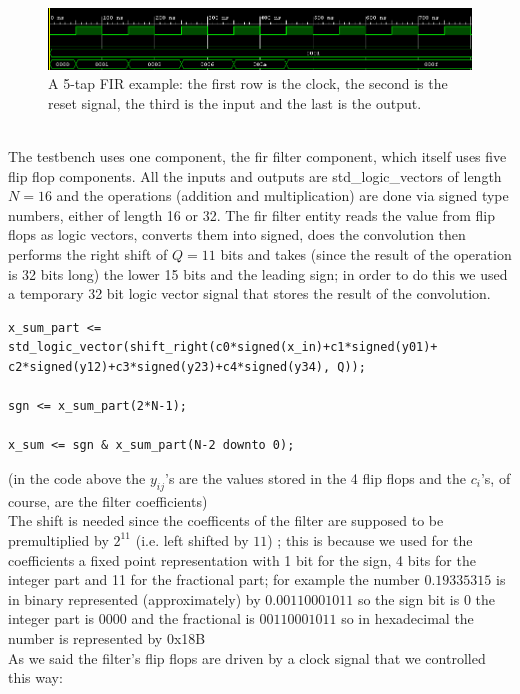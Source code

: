 \documentclass[a4paper,12pt]{article}
\begin{document}
\begin{figure}[h!]
	\begin{flushleft}
		\includegraphics[width=1.2\linewidth,keepaspectratio]{fir5ex.png}
	\end{flushleft}	
	\caption{A 5-tap FIR example: the first row is the clock, the second is the reset signal, the third is the input and the last is the output.}
	\label{fig:fir5ex}
\end{figure}\\
The testbench uses one component, the fir filter component,
which itself uses five flip flop components. All the inputs and outputs are std\_logic\_vectors of length $N=16$ and the operations (addition and multiplication) are done via signed type numbers, either of length 16 or 32. The fir filter entity reads the value from flip flops as logic vectors, converts them into signed, does the convolution then performs the right shift of $Q=11$ bits and takes (since the result of the operation is 32 bits long) the lower 15 bits and the leading sign; in order to do this we used a temporary 32 bit logic vector signal that stores the result of the convolution.
\begin{lstlisting}[style=vhdl]
x_sum_part <=
std_logic_vector(shift_right(c0*signed(x_in)+c1*signed(y01)+
c2*signed(y12)+c3*signed(y23)+c4*signed(y34), Q));

sgn <= x_sum_part(2*N-1);

x_sum <= sgn & x_sum_part(N-2 downto 0);
\end{lstlisting}
(in the code above the $y_{ij}$'s are the values stored in the 4 flip flops and the $c_i$'s, of course, are the filter coefficients)\\
The shift is needed since the coefficents of the filter are supposed to be premultiplied by $2^{11}$ (i.e. left shifted by $11$) ; this is because we used for the coefficients a fixed point representation with 1 bit for the sign, 4 bits for the integer part and 11 for the fractional part; for example the number $0.19335315$ is in binary represented (approximately) by $0.00110001011$ so the sign bit is $0$ the integer part is $0000$ and the fractional is $00110001011$ so in hexadecimal the number is represented by 0x18B\\
As we said the filter's flip flops are driven by a clock signal that we controlled this way:
\end{document}
